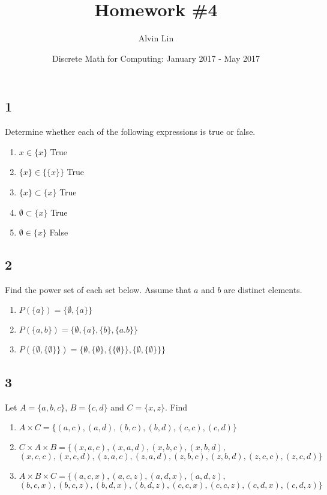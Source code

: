 \documentclass[letterpaper, 12pt]{math}
\title{Homework \#4}
\author{Alvin Lin}
\date{Discrete Math for Computing: January 2017 - May 2017}
\begin{document}
\maketitle

\subsection*{1}
Determine whether each of the following expressions is true or false.
\renewcommand{\labelenumi}{(\alph{enumi})}
\begin{enumerate}
  \item \( x \in \{x\} \) True
  \item \( \{x\} \in \{\{x\}\} \) True
  \item \( \{x\} \subset \{x\} \) True
  \item \( \emptyset \subset \{x\} \) True
  \item \( \emptyset \in \{x\} \) False
\end{enumerate}

\subsection*{2}
Find the power set of each set below. Assume that \( a \) and \( b \) are
distinct elements.
\begin{enumerate}
  \item \( P(\{a\}) = \{\emptyset,\{a\}\} \)
  \item \( P(\{a,b\}) = \{\emptyset,\{a\},\{b\},\{a.b\}\} \)
  \item \( P(\{\emptyset,\{\emptyset\}\}) = \{\emptyset,\{\emptyset\},
      \{\{\emptyset\}\},\{\emptyset,\{\emptyset\}\}\} \)
\end{enumerate}

\subsection*{3}
Let \( A = \{a,b,c\} \), \( B = \{c,d\} \) and \( C = \{x,z\} \). Find
\begin{enumerate}
  \item \( A\times C = \{(a,c),(a,d),(b,c),(b,d),(c,c),(c,d)\} \)
  \item \( C\times A\times B = \{(x,a,c),(x,a,d),(x,b,c),(x,b,d), \) \\
    \( (x,c,c),(x,c,d),(z,a,c),(z,a,d),(z,b,c),(z,b,d),(z,c,c),(z,c,d)\} \)
  \item \( A\times B\times C = \{(a,c,x),(a,c,z),(a,d,x),(a,d,z), \) \\
    \( (b,c,x),(b,c,z),(b,d,x),(b,d,z),(c,c,x),(c,c,z),(c,d,x),(c,d,z) \} \)
\end{enumerate}
\end{document}
